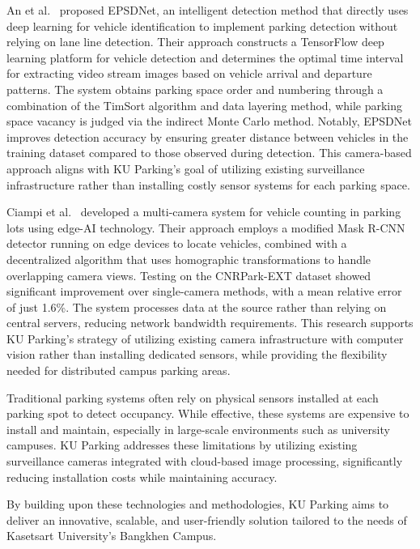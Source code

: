An et al.~ \cite{an2022epsdnet} proposed EPSDNet, an intelligent detection method that directly uses deep learning 
for vehicle identification to implement parking detection without relying on lane line detection.
 Their approach constructs a TensorFlow deep learning platform for vehicle detection and determines the optimal time interval for 
 extracting video stream images based on vehicle arrival and departure patterns. 
 The system obtains parking space order and numbering through a combination of the TimSort algorithm and data layering method, 
 while parking space vacancy is judged via the indirect Monte Carlo method. Notably, 
 EPSDNet improves detection accuracy by ensuring greater distance between vehicles in the training dataset compared to those observed during detection. 
 This camera-based approach aligns with KU Parking's goal of utilizing existing surveillance infrastructure rather than installing costly sensor systems for each parking space.

Ciampi et al.~ \cite{ciampi2022multicamera} developed a multi-camera system for vehicle counting in parking lots using edge-AI technology. 
Their approach employs a modified Mask R-CNN detector running on edge devices to locate vehicles, combined with a decentralized algorithm that uses homographic transformations to handle overlapping camera views. 
Testing on the CNRPark-EXT dataset showed significant improvement over single-camera methods, with a mean relative error of just 1.6\%. 
The system processes data at the source rather than relying on central servers, reducing network bandwidth requirements. 
This research supports KU Parking's strategy of utilizing existing camera infrastructure with computer vision rather than installing dedicated sensors, 
while providing the flexibility needed for distributed campus parking areas.

Traditional parking systems often rely on physical sensors installed at each parking spot to detect occupancy. 
While effective, these systems are expensive to install and maintain, especially in large-scale environments such as university campuses. 
KU Parking addresses these limitations by utilizing existing surveillance cameras integrated with cloud-based image processing, 
significantly reducing installation costs while maintaining accuracy.

By building upon these technologies and methodologies, KU Parking aims to deliver an innovative, scalable, and user-friendly solution tailored to the needs of Kasetsart University's Bangkhen Campus.